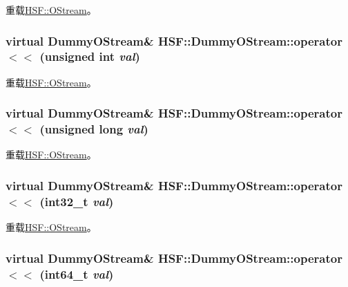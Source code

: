 重载\hyperlink{classHSF_1_1OStream_a8c3d22e78a10c990e136c1514dfc99c6}{HSF::OStream}。\hypertarget{classHSF_1_1DummyOStream_a9a138ca0d1ea4ebc7b3d699391bb3635}{
\subsubsection[{operator$<$$<$}]{\setlength{\rightskip}{0pt plus 5cm}virtual {\bf DummyOStream}\& HSF::DummyOStream::operator$<$$<$ (unsigned int {\em val})}}
\label{classHSF_1_1DummyOStream_a9a138ca0d1ea4ebc7b3d699391bb3635}


重载\hyperlink{classHSF_1_1OStream_aa0cd93dd86633a0603d09d35e20c9520}{HSF::OStream}。\hypertarget{classHSF_1_1DummyOStream_a7c3f9f5c2e3a05760819499df1aa6592}{
\subsubsection[{operator$<$$<$}]{\setlength{\rightskip}{0pt plus 5cm}virtual {\bf DummyOStream}\& HSF::DummyOStream::operator$<$$<$ (unsigned long {\em val})}}
\label{classHSF_1_1DummyOStream_a7c3f9f5c2e3a05760819499df1aa6592}


重载\hyperlink{classHSF_1_1OStream_ae4edb4f375ace6dab22021629c29a24f}{HSF::OStream}。\hypertarget{classHSF_1_1DummyOStream_a58e20bb47f254b73898d940bb496ee1f}{
\subsubsection[{operator$<$$<$}]{\setlength{\rightskip}{0pt plus 5cm}virtual {\bf DummyOStream}\& HSF::DummyOStream::operator$<$$<$ (int32\_\-t {\em val})}}
\label{classHSF_1_1DummyOStream_a58e20bb47f254b73898d940bb496ee1f}


重载\hyperlink{classHSF_1_1OStream_a1bbf47f6f3c68938fb4c1006b878aa60}{HSF::OStream}。\hypertarget{classHSF_1_1DummyOStream_a439a7fa1b22a1e7bcc49fa43c686dc0d}{
\subsubsection[{operator$<$$<$}]{\setlength{\rightskip}{0pt plus 5cm}virtual {\bf DummyOStream}\& HSF::DummyOStream::operator$<$$<$ (int64\_\-t {\em val})}}
\label{classHSF_1_1DummyOStream_a439a7fa1b22a1e7bcc49fa43c686dc0d}



